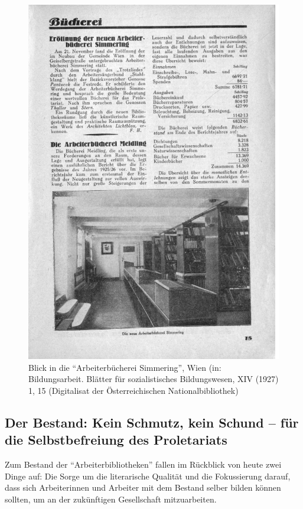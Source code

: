 \documentclass[a4paper,
fontsize=11pt,
oneside,
numbers=noperiodatend,
parskip=half-,
bibliography=totoc,
final
]{scrartcl}
\begin{document}
\begin{figure}
\centering
\includegraphics[width=14 cm]{img/Schuldt02.jpg}
\caption{Blick in die \enquote{Arbeiterbücherei Simmering}, Wien (in:
Bildungsarbeit. Blätter für sozialistisches Bildungswesen, XIV (1927) 1,
15 (Digitalisat der Österreichischen Nationalbibliothek)}
\end{figure}

\hypertarget{der-bestand-kein-schmutz-kein-schund-fuxfcr-die-selbstbefreiung-des-proletariats}{%
\subsection*{Der Bestand: Kein Schmutz, kein Schund -- für die
Selbstbefreiung des
Proletariats}\label{der-bestand-kein-schmutz-kein-schund-fuxfcr-die-selbstbefreiung-des-proletariats}}

Zum Bestand der \enquote{Arbeiterbibliotheken} fallen im Rückblick von
heute zwei Dinge auf: Die Sorge um die literarische Qualität und die
Fokussierung darauf, dass sich Arbeiterinnen und Arbeiter mit dem
Bestand selber bilden können sollten, um an der zukünftigen Gesellschaft
mitzuarbeiten.
\end{document}
